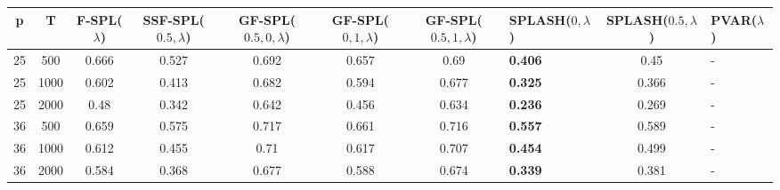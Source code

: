 \begin{tabular}{ccccccclcl}
\hline
  p  &  T   &  F-SPL($\lambda$)  &  SSF-SPL($0.5, \lambda$)  &  GF-SPL($0.5, 0, \lambda$)  &  GF-SPL($0, 1, \lambda$)  &  GF-SPL($0.5, 1, \lambda$)  & SPLASH($0, \lambda$)   &  SPLASH($0.5, \lambda$)  & PVAR($\lambda$)   \\
\hline
 25  & 500  &       0.666        &           0.527           &            0.692            &           0.657           &            0.69             & \textbf{0.406}         &           0.45           & -                 \\
 25  & 1000 &       0.602        &           0.413           &            0.682            &           0.594           &            0.677            & \textbf{0.325}         &          0.366           & -                 \\
 25  & 2000 &        0.48        &           0.342           &            0.642            &           0.456           &            0.634            & \textbf{0.236}         &          0.269           & -                 \\
 36  & 500  &       0.659        &           0.575           &            0.717            &           0.661           &            0.716            & \textbf{0.557}         &          0.589           & -                 \\
 36  & 1000 &       0.612        &           0.455           &            0.71             &           0.617           &            0.707            & \textbf{0.454}         &          0.499           & -                 \\
 36  & 2000 &       0.584        &           0.368           &            0.677            &           0.588           &            0.674            & \textbf{0.339}         &          0.381           & -                 \\
\hline
\end{tabular}